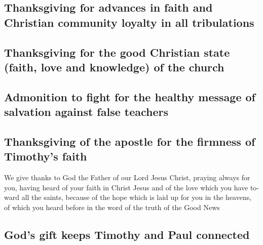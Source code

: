\begin{paracol}{2}
\begin{otherlanguage}{english}
\hypertarget{thanksgiving-for-advances-in-faith-and-christian-community-loyalty-in-all-tribulations}{%
\subsection{Thanksgiving for advances in faith and Christian community
loyalty in all
tribulations}\label{thanksgiving-for-advances-in-faith-and-christian-community-loyalty-in-all-tribulations}}

\hypertarget{thanksgiving-for-the-good-christian-state-faith-love-and-knowledge-of-the-church}{%
\subsection{Thanksgiving for the good Christian state (faith, love and
knowledge) of the
church}\label{thanksgiving-for-the-good-christian-state-faith-love-and-knowledge-of-the-church}}

\hypertarget{admonition-to-fight-for-the-healthy-message-of-salvation-against-false-teachers}{%
\subsection{Admonition to fight for the healthy message of salvation
against false
teachers}\label{admonition-to-fight-for-the-healthy-message-of-salvation-against-false-teachers}}

\hypertarget{thanksgiving-of-the-apostle-for-the-firmness-of-timothys-faith}{%
\subsection{Thanksgiving of the apostle for the firmness of Timothy's
faith}\label{thanksgiving-of-the-apostle-for-the-firmness-of-timothys-faith}}

 We give thanks to God the Father of our Lord Jesus
Christ, praying always for you,  having heard of your
faith in Christ Jesus and of the love which you have toward all the
saints,  because of the hope which is laid up for you in
the heavens, of which you heard before in the word of the truth of the
Good News

\hypertarget{gods-gift-keeps-timothy-and-paul-connected}{%
\subsection{God's gift keeps Timothy and Paul
connected}\label{gods-gift-keeps-timothy-and-paul-connected}}


\end{otherlanguage}
\end{paracol}
